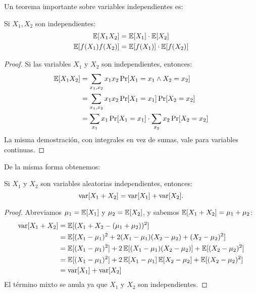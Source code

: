   Un teorema importante sobre variables independientes es:
  \begin{theorem}
    \label{theo:E-independientes}
    Si \(X_1, X_2\) son independientes:
    \begin{align*}
      \operatorname{\mathbb{E}}[X_1 X_2]
        &= \operatorname{\mathbb{E}}[X_1] \cdot \operatorname{\mathbb{E}}[X_2] \\
      \operatorname{\mathbb{E}}[f(X_1) f(X_2)]
        &= \operatorname{\mathbb{E}}[f(X_1)] \cdot \operatorname{\mathbb{E}}[f(X_2)]
    \end{align*}
  \end{theorem}
  \begin{proof}
    Si las variables \(X_1\) y \(X_2\) son independientes,
    entonces:
    \begin{align*}
      \operatorname{\mathbb{E}}[ X_1 X_2 ]
        &= \sum_{x_1, x_2} x_1 x_2 \Pr[ X_1 = x_1 \wedge X_2 = x_2 ] \\
        &= \sum_{x_1, x_2} x_1 x_2 \Pr[ X_1 = x_1 ] \Pr[X_2 = x_2 ] \\
        &= \sum_{x_1} x_1 \Pr[ X_1 = x_1 ]
             \cdot \sum_{x_2} x_2 \Pr[X_2 = x_2 ]
    \end{align*}
    La misma demostración,
    con integrales en vez de sumas,
    vale para variables continuas.
  \end{proof}
  De la misma forma obtenemos:
  \begin{theorem}
    \label{theo:varianza-suma}
    Si \(X_1\) y \(X_2\) son variables aleatorias independientes,
    entonces:
    \begin{equation*}
      \operatorname{var}[X_1 + X_2]
        = \operatorname{var}[X_1] + \operatorname{var}[X_2].
    \end{equation*}
  \end{theorem}
  \begin{proof}
    Abreviamos \(\mu_1 = \operatorname{\mathbb{E}}[X_1]\) y \(\mu_2 = \operatorname{\mathbb{E}}[X_2]\),
    y sabemos \(\operatorname{\mathbb{E}}[X_1 + X_2] = \mu_1 + \mu_2\):
    \begin{align*}
      \operatorname{var}[X_1 + X_2]
        &= \operatorname{\mathbb{E}}[(X_1 + X_2 - (\mu_1 + \mu_2))^2] \\
        &= \operatorname{\mathbb{E}}[(X_1 - \mu_1)^2
                   + 2 (X_1 - \mu_1) (X_2 - \mu_2)
                   + (X_2 - \mu_2)^2] \\
       &= \operatorname{\mathbb{E}}[(X_1 - \mu_1)^2]
            + 2 \operatorname{\mathbb{E}}[(X_1 - \mu_1)(X_2 - \mu_2)]
            + \operatorname{\mathbb{E}}[(X_2 - \mu_2)^2] \\
       &= \operatorname{\mathbb{E}}[(X_1 - \mu_1)^2]
            + 2 \operatorname{\mathbb{E}}[X_1 - \mu_1] \operatorname{\mathbb{E}}[X_2 - \mu_2]
            + \operatorname{\mathbb{E}}[(X_2 - \mu_2)^2] \\
       &= \operatorname{var}[X_1] + \operatorname{var}[X_2]
    \end{align*}
    El término mixto se anula ya que \(X_1\) y \(X_2\) son independientes.
  \end{proof}

